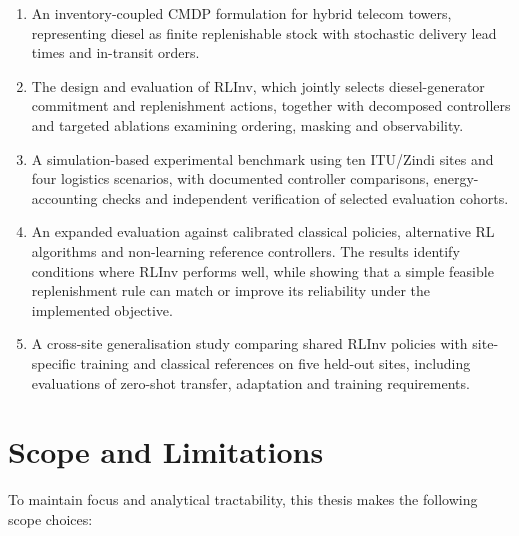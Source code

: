 \begin{enumerate}

\item An inventory-coupled CMDP formulation for
hybrid telecom towers, representing diesel as
finite replenishable stock with stochastic
delivery lead times and in-transit orders.

\item The design and evaluation of RLInv, which
jointly selects diesel-generator commitment
and replenishment actions, together with
decomposed controllers and targeted ablations
examining ordering, masking and observability.

\item A simulation-based experimental benchmark
using ten ITU/Zindi sites and four logistics
scenarios, with documented controller comparisons,
energy-accounting checks and independent
verification of selected evaluation cohorts.

\item An expanded evaluation against calibrated
classical policies, alternative RL algorithms
and non-learning reference controllers. The
results identify conditions where RLInv performs
well, while showing that a simple feasible
replenishment rule can match or improve its
reliability under the implemented objective.

\item A cross-site generalisation study comparing
shared RLInv policies with site-specific
training and classical references on five
held-out sites, including evaluations of
zero-shot transfer, adaptation and training
requirements.

\end{enumerate}



\section{Scope and Limitations}

To maintain focus and analytical tractability, this thesis makes the following
scope choices:

